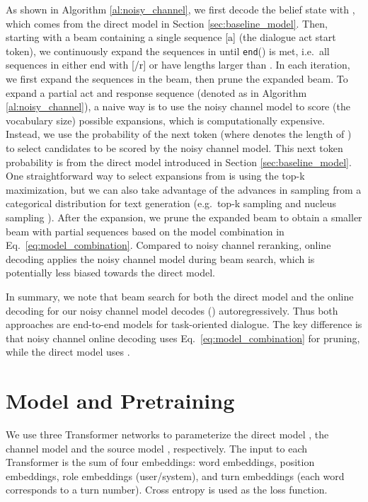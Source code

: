 \documentclass[11pt,a4paper]{article}
\begin{document}
As shown in Algorithm \ref{al:noisy_channel}, we first decode the belief state with , which comes from the direct model in Section \ref{sec:baseline_model}. Then, starting with a beam  containing a single sequence \textcolor{black}{[a]} (the dialogue act start token), we continuously expand the sequences in  until \texttt{end}() is met, i.e.\ all sequences in  either end with \textcolor{black}{[/r]} or have lengths larger than . In each iteration, we first expand the sequences in the beam, then prune the expanded beam. To expand a partial act and response sequence (denoted as  in Algorithm \ref{al:noisy_channel}), a naive way is to use the noisy channel model to score  (the vocabulary size) possible expansions, which is computationally expensive. Instead, we use the probability of the next token  (where  denotes the length of ) to select  candidates to be scored by the noisy channel model. This next token probability is from the direct model introduced in Section \ref{sec:baseline_model}. One straightforward way to select  expansions from  is using the top-k maximization, but we can also take advantage of the advances in sampling from a categorical distribution for text generation (e.g.\ top-k sampling \cite{fan2018hierarchical} and nucleus sampling \cite{holtzman2019curious}). After the expansion, we prune the expanded beam  to obtain a smaller beam with  partial sequences based on the model combination in Eq.\ \ref{eq:model_combination}. Compared to noisy channel reranking, online decoding applies the noisy channel model during beam search, which is potentially less biased towards the direct model.


In summary, we note that beam search for both the direct model and the online decoding for our noisy channel model decodes () autoregressively. Thus both approaches are end-to-end models for task-oriented dialogue. The key difference is that noisy channel online decoding uses Eq.\ \ref{eq:model_combination} for pruning, while the direct model uses .

\section{Model and Pretraining}

We use three Transformer \cite{vaswani2017attention} networks to parameterize the direct model , the channel model  and the source model , respectively. The input to each Transformer is the sum of four embeddings: word embeddings, position embeddings, role embeddings (user/system), and turn embeddings (each word corresponds to a turn number). Cross entropy is used as the loss function.
\end{document}
